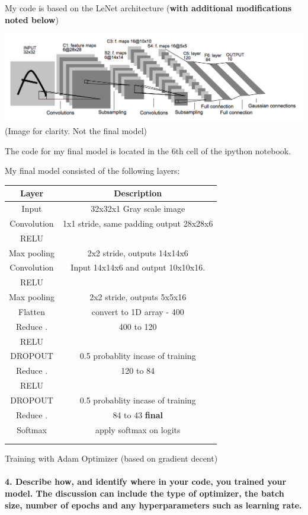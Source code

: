 \documentclass[11pt]{article}
\makeatletter
\def\maxwidth{\ifdim\Gin@nat@width>\linewidth\linewidth
    \else\Gin@nat@width\fi}
\let\Oldincludegraphics\includegraphics
\renewcommand{\includegraphics}[1]{\Oldincludegraphics[width=.8\maxwidth]{#1}}
\makeatother
\begin{document}
My code is based on the LeNet architecture (\textbf{with additional
modifications noted below})

\includegraphics{./examples/lenet.png} (Image for clarity. Not the final
model)

The code for my final model is located in the 6th cell of the ipython
notebook.

My final model consisted of the following layers:

\begin{longtable}[]{@{}cc@{}}
\toprule
Layer & Description\tabularnewline
\midrule
\endhead
Input & 32x32x1 Gray scale image\tabularnewline
Convolution & 1x1 stride, same padding output 28x28x6\tabularnewline
RELU &\tabularnewline
Max pooling & 2x2 stride, outputs 14x14x6\tabularnewline
Convolution & Input 14x14x6 and output 10x10x16.\tabularnewline
RELU &\tabularnewline
Max pooling & 2x2 stride, outputs 5x5x16\tabularnewline
Flatten & convert to 1D array - 400\tabularnewline
Reduce . & 400 to 120\tabularnewline
RELU &\tabularnewline
DROPOUT & 0.5 probablity incase of training\tabularnewline
Reduce . & 120 to 84\tabularnewline
RELU &\tabularnewline
DROPOUT & 0.5 probablity incase of training\tabularnewline
Reduce . & 84 to 43 \textbf{final}\tabularnewline
Softmax & apply softmax on logits\tabularnewline
&\tabularnewline
&\tabularnewline
\bottomrule
\end{longtable}

Training with Adam Optimizer (based on gradient decent)

\paragraph{4. Describe how, and identify where in your code, you trained
your model. The discussion can include the type of optimizer, the batch
size, number of epochs and any hyperparameters such as learning
rate.}\label{describe-how-and-identify-where-in-your-code-you-trained-your-model.-the-discussion-can-include-the-type-of-optimizer-the-batch-size-number-of-epochs-and-any-hyperparameters-such-as-learning-rate.}
\end{document}
